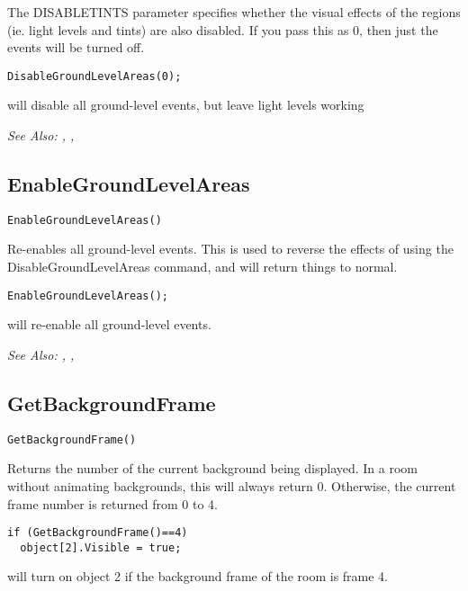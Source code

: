 The DISABLETINTS parameter specifies whether the visual effects of the regions (ie. light
levels and tints) are also disabled. If you pass this as 0, then just the events will
be turned off.

\begin{verbatim}
DisableGroundLevelAreas(0);
\end{verbatim}
will disable all ground-level events, but leave light levels working

\it{See Also:} , ,


\subsection{EnableGroundLevelAreas}\label{EnableGroundLevelAreas}%

\begin{verbatim}
EnableGroundLevelAreas()
\end{verbatim}
Re-enables all ground-level events. This is used to reverse the effects of
using the DisableGroundLevelAreas command, and will return things to normal.

\begin{verbatim}
EnableGroundLevelAreas();
\end{verbatim}
will re-enable all ground-level events.

\it{See Also:} , ,


\subsection{GetBackgroundFrame}\label{GetBackgroundFrame}%

\begin{verbatim}
GetBackgroundFrame()
\end{verbatim}
Returns the number of the current background being displayed. In a room
without animating backgrounds, this will always return 0. Otherwise, the
current frame number is returned from 0 to 4.

\begin{verbatim}
if (GetBackgroundFrame()==4)
  object[2].Visible = true;
\end{verbatim}
will turn on object 2 if the background frame of the room is frame 4.

